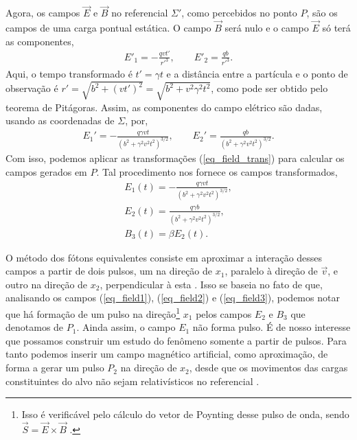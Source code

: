 Agora, os campos $\vec{E}$ e $\vec{B}$ no referencial $\Sigma '$, como
percebidos no ponto $P$, são os campos de uma carga pontual estática. O campo
$\vec{B}$ será nulo e o campo $\vec{E}$ só terá as componentes,
\begin{gather}
	E' _1 = -\frac{qvt'}{{r'}^3}, \qquad
	E' _2 = \frac{qb}{{r'}^3}.
\end{gather}
Aqui, o tempo transformado é $t' = \gamma t$ e a distância entre a partícula e
o ponto de observação é $r' = \sqrt{b^2 + (vt')^2} = \sqrt{b^2 + v^2 \gamma ^2
t^2}$, como pode ser obtido pelo teorema de Pitágoras. Assim, as componentes do
campo elétrico são dadas, usando as coordenadas de $\Sigma$, por,
\begin{gather}
	E _1 '= - \frac{q\gamma vt}{(b^2 + \gamma ^2 v^2 t^2)^{3/2}},\qquad
	E _2 '= \frac{qb}{(b^2 + \gamma ^2 v^2 t^2)^{3/2}}.
\end{gather}
Com isso, podemos aplicar as transformações (\ref{eq_field_trans}) para
calcular os campos gerados em $P$. Tal procedimento nos fornece os campos
transformados,
\begin{gather}%
	E_1 (t) = -\frac{q\gamma vt}{(b^2 + \gamma ^2 v^2t^2)^{3/2}}
		\label{eq_field1},\\
	E_2 (t) = \frac{q\gamma b}{(b^2 + \gamma ^2 v^2 t
		^2)^{3/2}}\label{eq_field2},\\ 
	B_3 (t) = \beta E_2(t) \label{eq_field3}.
\end{gather}

O método dos fótons equivalentes consiste em aproximar a
interação desses campos a partir de dois pulsos, um na direção de $x_1$,
paralelo à direção de $\vec{v}$, e outro na direção de $x_2$, perpendicular à
esta \cite{caruso_quanta}. Isso se baseia no fato de que, analisando os campos (\ref{eq_field1}),
(\ref{eq_field2}) e (\ref{eq_field3}), podemos notar que há formação de um
pulso na direção\footnote{Isso é verificável pelo cálculo do vetor de Poynting
desse pulso de onda, sendo $\vec{S} = \vec{E}\times \vec{B}$ \cite{jackson3}.}
$x_1$ pelos campos $E_2$ e $B_3$ que denotamos de $P_1$.  Ainda assim, o campo
$E_1$ não forma pulso. É de nosso interesse que possamos construir um estudo do
fenômeno somente a partir de pulsos. Para tanto podemos inserir um campo magnético
artificial, como aproximação, de forma a gerar um pulso $P_2$ na direção de
$x_2$, desde que os movimentos das cargas constituintes do alvo não sejam
relativísticos no referencial \cite{jackson3}.

